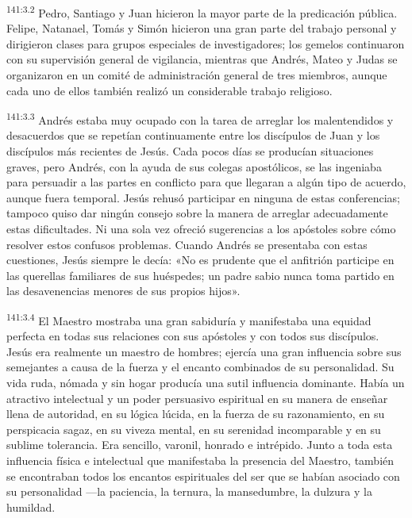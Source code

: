 \par
\textsuperscript{141:3.2} Pedro, Santiago y Juan hicieron la mayor parte de la predicación pública. Felipe, Natanael, Tomás y Simón hicieron una gran parte del trabajo personal y dirigieron clases para grupos especiales de investigadores; los gemelos continuaron con su supervisión general de vigilancia, mientras que Andrés, Mateo y Judas se organizaron en un comité de administración general de tres miembros, aunque cada uno de ellos también realizó un considerable trabajo religioso.

\par
\textsuperscript{141:3.3} Andrés estaba muy ocupado con la tarea de arreglar los malentendidos y desacuerdos que se repetían continuamente entre los discípulos de Juan y los discípulos más recientes de Jesús. Cada pocos días se producían situaciones graves, pero Andrés, con la ayuda de sus colegas apostólicos, se las ingeniaba para persuadir a las partes en conflicto para que llegaran a algún tipo de acuerdo, aunque fuera temporal. Jesús rehusó participar en ninguna de estas conferencias; tampoco quiso dar ningún consejo sobre la manera de arreglar adecuadamente estas dificultades. Ni una sola vez ofreció sugerencias a los apóstoles sobre cómo resolver estos confusos problemas. Cuando Andrés se presentaba con estas cuestiones, Jesús siempre le decía: «No es prudente que el anfitrión participe en las querellas familiares de sus huéspedes; un padre sabio nunca toma partido en las desavenencias menores de sus propios hijos».

\par
\textsuperscript{141:3.4} El Maestro mostraba una gran sabiduría y manifestaba una equidad perfecta en todas sus relaciones con sus apóstoles y con todos sus discípulos. Jesús era realmente un maestro de hombres; ejercía una gran influencia sobre sus semejantes a causa de la fuerza y el encanto combinados de su personalidad. Su vida ruda, nómada y sin hogar producía una sutil influencia dominante. Había un atractivo intelectual y un poder persuasivo espiritual en su manera de enseñar llena de autoridad, en su lógica lúcida, en la fuerza de su razonamiento, en su perspicacia sagaz, en su viveza mental, en su serenidad incomparable y en su sublime tolerancia. Era sencillo, varonil, honrado e intrépido. Junto a toda esta influencia física e intelectual que manifestaba la presencia del Maestro, también se encontraban todos los encantos espirituales del ser que se habían asociado con su personalidad ---la paciencia, la ternura, la mansedumbre, la dulzura y la humildad.

